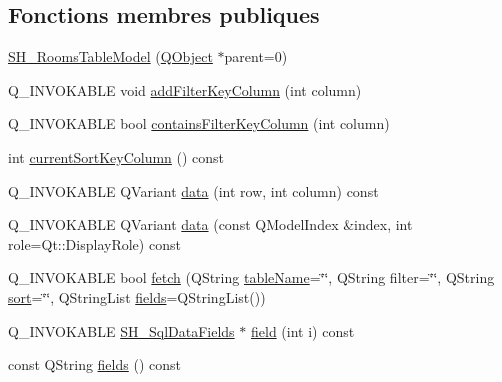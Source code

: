 \subsection*{Fonctions membres publiques}
\begin{DoxyCompactItemize}
\item 
\hyperlink{classSimpleHotel_1_1SH__RoomsTableModel_a3e4ef51e6a16172de3cc5658c98a8793}{S\-H\-\_\-\-Rooms\-Table\-Model} (\hyperlink{classQObject}{Q\-Object} $\ast$parent=0)
\item 
Q\-\_\-\-I\-N\-V\-O\-K\-A\-B\-L\-E void \hyperlink{classSimpleHotel_1_1SH__ExtendedProxyModel_af8036ffa208ebaf55129cce307c3e296}{add\-Filter\-Key\-Column} (int column)
\item 
Q\-\_\-\-I\-N\-V\-O\-K\-A\-B\-L\-E bool \hyperlink{classSimpleHotel_1_1SH__ExtendedProxyModel_a4db5231a36976dd249ec1439422e331c}{contains\-Filter\-Key\-Column} (int column)
\item 
int \hyperlink{classSimpleHotel_1_1SH__ExtendedProxyModel_a2acd8779c72617f4b6a195ee9341b28b}{current\-Sort\-Key\-Column} () const 
\item 
Q\-\_\-\-I\-N\-V\-O\-K\-A\-B\-L\-E Q\-Variant \hyperlink{classSimpleHotel_1_1SH__ExtendedProxyModel_a24edf7c777ce9e00a07b30614ee71019}{data} (int row, int column) const 
\item 
Q\-\_\-\-I\-N\-V\-O\-K\-A\-B\-L\-E Q\-Variant \hyperlink{classSimpleHotel_1_1SH__ExtendedProxyModel_a25bc1047c6e9835d9d3c580e0a4ec42a}{data} (const Q\-Model\-Index \&index, int role=Qt\-::\-Display\-Role) const 
\item 
Q\-\_\-\-I\-N\-V\-O\-K\-A\-B\-L\-E bool \hyperlink{classSimpleHotel_1_1SH__ExtendedProxyModel_a422dc77c44ec3ded9291812efb128053}{fetch} (Q\-String \hyperlink{classSimpleHotel_1_1SH__ExtendedProxyModel_a49617ea8bab745425beec3dbd3fddba7}{table\-Name}=\char`\"{}\char`\"{}, Q\-String filter=\char`\"{}\char`\"{}, Q\-String \hyperlink{classSimpleHotel_1_1SH__ExtendedProxyModel_a5d7686a9fae295e0662057b8450c8a8d}{sort}=\char`\"{}\char`\"{}, Q\-String\-List \hyperlink{classSimpleHotel_1_1SH__ExtendedProxyModel_a4b57bc85b18fa1e71073526abb798fb6}{fields}=Q\-String\-List())
\item 
Q\-\_\-\-I\-N\-V\-O\-K\-A\-B\-L\-E \hyperlink{classSimpleHotel_1_1SH__SqlDataFields}{S\-H\-\_\-\-Sql\-Data\-Fields} $\ast$ \hyperlink{classSimpleHotel_1_1SH__ExtendedProxyModel_ac091225266a35c84307835f40d9b6e9b}{field} (int i) const 
\item 
const Q\-String \hyperlink{classSimpleHotel_1_1SH__ExtendedProxyModel_a4b57bc85b18fa1e71073526abb798fb6}{fields} () const 

\end{DoxyCompactItemize}
